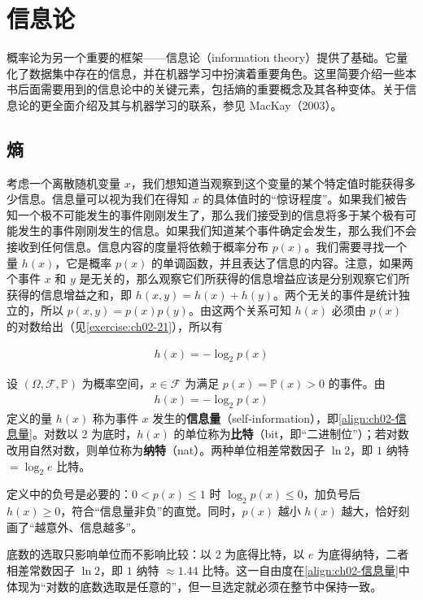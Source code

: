 \documentclass[../../main.tex]{subfiles}
\begin{document}
\section{信息论}\label{section:ch02-信息论}

概率论为另一个重要的框架——信息论（information theory）提供了基础。它量化了数据集中存在的信息，并在机器学习中扮演着重要角色。这里简要介绍一些本书后面需要用到的信息论中的关键元素，包括熵的重要概念及其各种变体。关于信息论的更全面介绍及其与机器学习的联系，参见 MacKay（2003）。

\subsection{熵}\label{subsection:ch02-熵}

考虑一个离散随机变量 $x$，我们想知道当观察到这个变量的某个特定值时能获得多少信息。信息量可以视为我们在得知 $x$ 的具体值时的“惊讶程度”。如果我们被告知一个极不可能发生的事件刚刚发生了，那么我们接受到的信息将多于某个极有可能发生的事件刚刚发生的信息。如果我们知道某个事件确定会发生，那么我们不会接收到任何信息。信息内容的度量将依赖于概率分布 $p(x)$。我们需要寻找一个量 $h(x)$，它是概率 $p(x)$ 的单调函数，并且表达了信息的内容。注意，如果两个事件 $x$ 和 $y$ 是无关的，那么观察它们所获得的信息增益应该是分别观察它们所获得的信息增益之和，即 $h(x,y)=h(x)+h(y)$。两个无关的事件是统计独立的，所以 $p(x,y)=p(x)p(y)$。由这两个关系可知 $h(x)$ 必须由 $p(x)$ 的对数给出（见\cref{exercise:ch02-21}），所以有

\begin{align}
  h(x) = -\log_2 p(x)
  \label{align:ch02-信息量}
\end{align}

\begin{definition}[信息量]\label{definition:ch02-信息量}
设 $(\Omega,\mathcal{F},\mathbb{P})$ 为概率空间，$x\in\mathcal{F}$ 为满足 $p(x)=\mathbb{P}(x)>0$ 的事件。由
\begin{align*}
  h(x)=-\log_2 p(x)
\end{align*}
定义的量 $h(x)$ 称为事件 $x$ 发生的\textbf{信息量}（self-information），即\eqref{align:ch02-信息量}。对数以 2 为底时，$h(x)$ 的单位称为\textbf{比特}（bit，即“二进制位”）；若对数改用自然对数，则单位称为\textbf{纳特}（nat）。两种单位相差常数因子 $\ln 2$，即 $1$ 纳特 $=\log_2 e$ 比特。
\end{definition}

\begin{remark}
定义中的负号是必要的：$0<p(x)\leqslant1$ 时 $\log_2p(x)\leqslant0$，加负号后 $h(x)\geqslant0$，符合“信息量非负”的直觉。同时，$p(x)$ 越小 $h(x)$ 越大，恰好刻画了“越意外、信息越多”。

底数的选取只影响单位而不影响比较：以 2 为底得比特，以 $e$ 为底得纳特，二者相差常数因子 $\ln2$，即 $1$ 纳特 $\approx1.44$ 比特。这一自由度在\eqref{align:ch02-信息量}中体现为“对数的底数选取是任意的”，但一旦选定就必须在整节中保持一致。
\end{remark}
\end{document}

